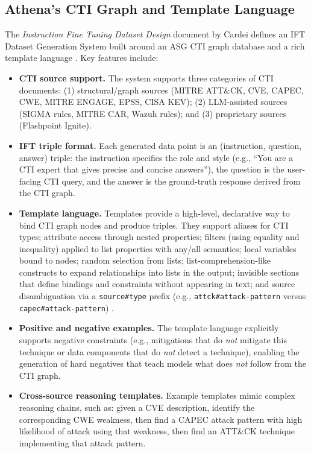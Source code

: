 \documentclass[unnumsec,webpdf,contemporary,large]{oup-authoring-template}
\theoremstyle{thmstyleone}
\theoremstyle{thmstyletwo}
\theoremstyle{thmstylethree}
\begin{document}
\subsection{Athena's CTI Graph and Template Language}

The \emph{Instruction Fine Tuning Dataset Design} document by Cardei defines an IFT Dataset Generation System built around an ASG CTI graph database and a rich template language \cite{cardei2025ift}. Key features include:

\begin{itemize}
  \item \textbf{CTI source support.} The system supports three categories of CTI documents: (1) structural/graph sources (MITRE ATT\&CK, CVE, CAPEC, CWE, MITRE ENGAGE, EPSS, CISA KEV); (2) LLM-assisted sources (SIGMA rules, MITRE CAR, Wazuh rules); and (3) proprietary sources (Flashpoint Ignite).
  \item \textbf{IFT triple format.} Each generated data point is an (instruction, question, answer) triple: the instruction specifies the role and style (e.g., ``You are a CTI expert that gives precise and concise answers''), the question is the user-facing CTI query, and the answer is the ground-truth response derived from the CTI graph.
  \item \textbf{Template language.} Templates provide a high-level, declarative way to bind CTI graph nodes and produce triples. They support aliases for CTI types; attribute access through nested properties; filters (using equality and inequality) applied to list properties with any/all semantics; local variables bound to nodes; random selection from lists; list-comprehension-like constructs to expand relationships into lists in the output; invisible sections that define bindings and constraints without appearing in text; and source disambiguation via a \verb|source#type| prefix (e.g., \verb|attck#attack-pattern| versus \verb|capec#attack-pattern|) \cite{cardei2025ift}.
  \item \textbf{Positive and negative examples.} The template language explicitly supports negative constraints (e.g., mitigations that do \emph{not} mitigate this technique or data components that do \emph{not} detect a technique), enabling the generation of hard negatives that teach models what does \emph{not} follow from the CTI graph.
  \item \textbf{Cross-source reasoning templates.} Example templates mimic complex reasoning chains, such as: given a CVE description, identify the corresponding CWE weakness, then find a CAPEC attack pattern with high likelihood of attack using that weakness, then find an ATT\&CK technique implementing that attack pattern.

\end{itemize}
\end{document}
